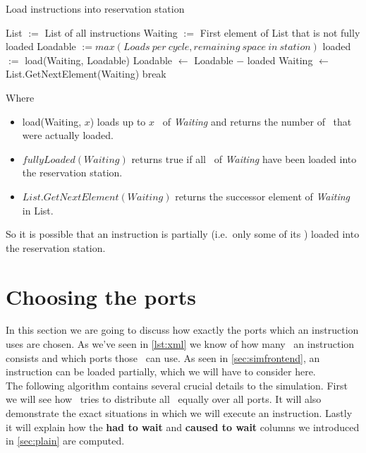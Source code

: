 \begin{algorithm}[H]
    \SetAlgoLined
    \caption{Load instructions into reservation station}
    List $:=$ List of all instructions\;
    Waiting $:=$ First element of List that is not fully loaded\;
    Loadable $:= max(Loads\ per\ cycle, remaining\ space\ in\ station)$\;
     {
        loaded $:=$ load\microops(Waiting, Loadable)\;
        Loadable $\leftarrow$ Loadable $-$ loaded\;
         {
            Waiting $\leftarrow$ List.GetNextElement(Waiting)\;
        } {
            break\;
        }
    }
\end{algorithm}
\newpage
Where
\begin{itemize}
    \item load\microops(Waiting, $x$) loads up to $x$ \microops\ of \emph{Waiting} and returns the number of \microops\ that were actually loaded.
    \item $fullyLoaded(Waiting)$ returns true if all \microops\ of \emph{Waiting} have been loaded into the reservation station.
    \item $List.GetNextElement(Waiting)$ returns the successor element of \emph{Waiting} in List.
\end{itemize}

So it is possible that an instruction is partially (i.e.\ only some of its \microops) loaded into the reservation station.

\section{Choosing the ports}
\label{sec:chooseport}

In this section we are going to discuss how exactly the ports which an instruction uses are chosen. As we've seen in \autoref{lst:xml} we know of how many \microops\ an instruction consists and which ports those \microops\ can use. As seen in \autoref{sec:simfrontend}, an instruction can be loaded partially, which we will have to consider here.\\
The following algorithm contains several crucial details to the simulation. First we will see how \suaca\ tries to distribute all \microops\ equally over all ports. It will also demonstrate the exact situations in which we will execute an instruction. Lastly it will explain how the \textbf{had to wait} and \textbf{caused to wait} columns we introduced in \autoref{sec:plain} are computed. 
\newpage

